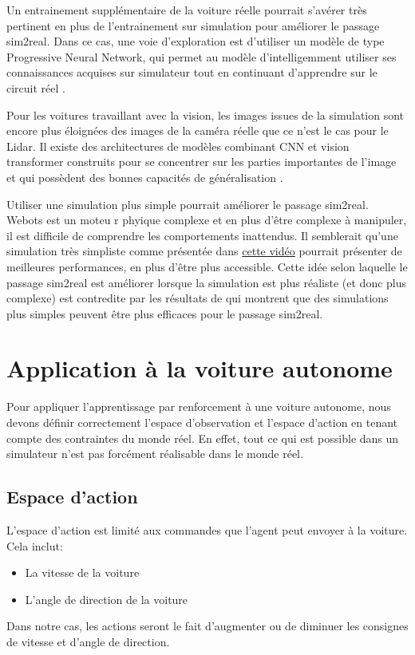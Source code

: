 \documentclass[french]{article}
\begin{document}
\vspace{1cm}

Un entrainement supplémentaire de la voiture réelle pourrait s'avérer très pertinent en plus de l'entrainement sur simulation pour améliorer le passage sim2real. Dans ce cas, une voie d'exploration est d'utiliser un modèle de type Progressive Neural Network, qui permet au modèle d'intelligemment utiliser ses connaissances acquises sur simulateur tout en continuant d'apprendre sur le circuit réel \cite{rusu2022progressive}. 

\vspace{0.5cm}

Pour les voitures travaillant avec la vision, les images issues de la simulation sont encore plus éloignées des images de la caméra réelle que ce n'est le cas pour le Lidar. Il existe des architectures de modèles combinant CNN et vision transformer construits pour se concentrer sur les parties importantes de l'image et qui possèdent des bonnes capacités de généralisation \cite{li2023style}.

\vspace{0.5cm}

Utiliser une simulation plus simple pourrait améliorer le passage sim2real. Webots est un moteu r phyique complexe et en plus d'être complexe à manipuler, il est difficile de comprendre les comportements inattendus. Il semblerait qu'une simulation très simpliste comme présentée dans \href{https://www.youtube.com/watch?v=Cy155O5R1Oo&list=PLg2V2juOLiPWxd5fQOz1la37etAf9_WoW&index=4}{cette vidéo} pourrait présenter de meilleures performances, en plus d'être plus accessible. Cette idée selon laquelle le passage sim2real est améliorer lorsque la simulation est plus réaliste (et donc plus complexe) est contredite par les résultats de \cite{pmlr-v205-truong23a} qui montrent que des simulations plus simples peuvent être plus efficaces pour le passage sim2real.



\section{Application à la voiture autonome}
Pour appliquer l'apprentissage par renforcement à une voiture autonome, nous devons définir correctement 
l'espace d'observation et l'espace d'action en tenant compte des contraintes du monde réel. En effet, 
tout ce qui est possible dans un simulateur n'est pas forcément réalisable dans le monde réel. 

\subsection{Espace d'action}
L'espace d'action est limité aux commandes que l'agent peut envoyer à la voiture. Cela inclut:
\begin{itemize}
    \item La vitesse de la voiture
    \item L'angle de direction de la voiture
\end{itemize}
Dans notre cas, les actions seront le fait d'augmenter ou de diminuer les consignes de vitesse et d'angle de direction.
\end{document}
